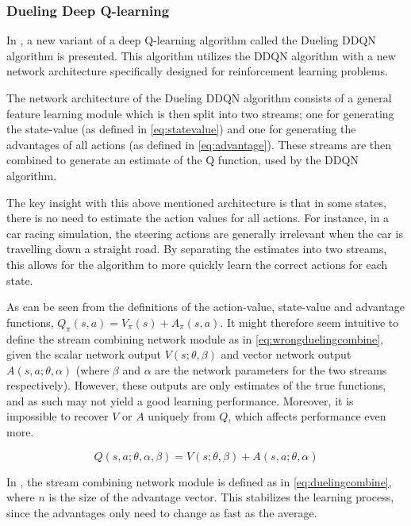 \documentclass{kththesis}
\begin{document}
\subsubsection{Dueling Deep Q-learning}
In \textcite{wang2015dueling}, a new variant of a deep Q-learning algorithm called the Dueling DDQN algorithm is presented. This algorithm utilizes the DDQN algorithm with a new network architecture specifically designed for reinforcement learning problems. 

The network architecture of the Dueling DDQN algorithm consists of a general feature learning module which is then split into two streams; one for generating the state-value (as defined in \autoref{eq:statevalue}) and one for generating the advantages of all actions (as defined in \autoref{eq:advantage}). These streams are then combined to generate an estimate of the Q function, used by the DDQN algorithm.

The key insight with this above mentioned architecture is that in some states, there is no need to estimate the action values for all actions. For instance, in a car racing simulation, the steering actions are generally irrelevant when the car is travelling down a straight road. By separating the estimates into two streams, this allows for the algorithm to more quickly learn the correct actions for each state. \parencite{wang2015dueling}

As can be seen from the definitions of the action-value, state-value and advantage functions, $Q_\pi(s, a) = V_\pi(s) + A_\pi(s, a)$. It might therefore seem intuitive to define the stream combining network module as in \autoref{eq:wrongduelingcombine}, given the scalar network output $V(s;\theta,\beta)$ and vector network output $A(s, a;\theta, \alpha)$ (where $\beta$ and $\alpha$ are the network parameters for the two streams respectively). However, these outputs are only estimates of the true functions, and as such may not yield a good learning performance. Moreover, it is impossible to recover $V$ or $A$ uniquely from $Q$, which affects performance even more. \parencite{wang2015dueling}

\begin{equation}
\label{eq:wrongduelingcombine}
Q(s,a;\theta,\alpha,\beta) = V(s;\theta,\beta) + A(s, a;\theta, \alpha)
\end{equation}

In \textcite{wang2015dueling}, the stream combining network module is defined as in \autoref{eq:duelingcombine}, where $n$ is the size of the advantage vector. This stabilizes the learning process, since the advantages only need to change as fast as the average. 
\end{document}
